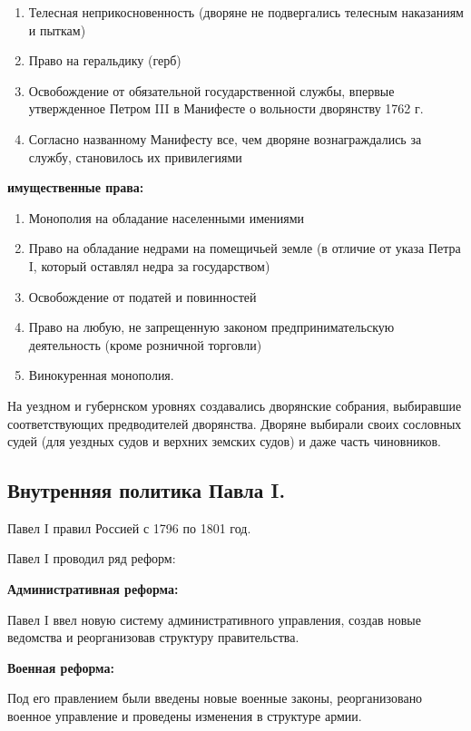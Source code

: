 \begin{enumerate}
    \item{ Телесная неприкосновенность (дворяне не подвергались телесным наказаниям и пыткам) }
    \item{ Право на геральдику (герб) }
    \item{ Освобождение от обязательной государственной службы, впервые утвержденное Петром III в Манифесте о вольности дворянству 1762 г. }
    \item{ Согласно названному Манифесту все, чем дворяне вознаграждались за службу, становилось их привилегиями}
\end{enumerate}

\textbf{имущественные права:}

\begin{enumerate}
    \item{ Монополия на обладание населенными имениями }
    \item{ Право на обладание недрами на помещичьей земле (в отличие от указа Петра I, который оставлял недра за государством) }
    \item{ Освобождение от податей и повинностей }
    \item{ Право на любую, не запрещенную законом предпринимательскую деятельность (кроме розничной торговли) }
    \item{ Винокуренная монополия. }
\end{enumerate}

На уездном и губернском уровнях создавались дворянские собрания, выбиравшие соответствующих предводителей дворянства. Дворяне выбирали своих сословных судей (для уездных судов и верхних земских судов) и даже часть чиновников.

\subsection{Внутренняя политика Павла I.}

Павел I правил Россией с 1796 по 1801 год. 

Павел I проводил ряд реформ:

\textbf{Административная реформа:}

Павел I ввел новую систему административного управления, создав новые ведомства и реорганизовав структуру правительства.

\textbf{Военная реформа:}

Под его правлением были введены новые военные законы, реорганизовано военное управление и проведены изменения в структуре армии.

